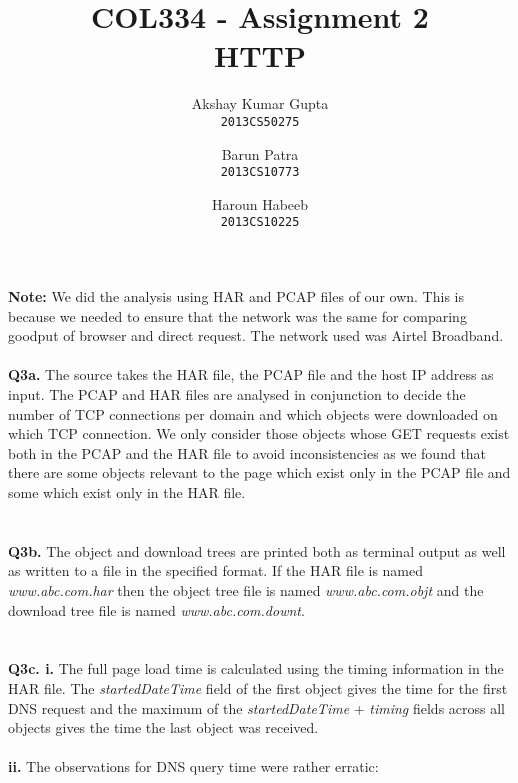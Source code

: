 \documentclass[12pt]{article}
\begin{document}
\title{COL334 - Assignment 2\\ HTTP}
\author{Akshay Kumar Gupta\\\texttt{2013CS50275} \and  Barun Patra\\\texttt{2013CS10773} \and Haroun Habeeb\\\texttt{2013CS10225}}
\date{}
\maketitle
\noindent
\textbf{Note:} We did the analysis using HAR and PCAP files of our own. This is because we needed to ensure that the network was the same for comparing goodput of browser and direct request. The network used was Airtel Broadband.\\\\
{\bfseries Q3a.} The source takes the HAR file, the PCAP file and the host IP address as input. The PCAP and HAR files are analysed in conjunction to decide the number of TCP connections per domain and which objects were downloaded on which TCP connection. We only consider those objects whose GET requests exist both in the PCAP and the HAR file to avoid inconsistencies as we found that there are some objects relevant to the page which exist only in the PCAP file and some which exist only in the HAR file.
\\\\\\
{\bfseries Q3b.} The object and download trees are printed both as terminal output as well as written to a file in the specified format. If the HAR file is named \emph{www.abc.com.har} then the object tree file is named \emph{www.abc.com.objt} and the download tree file is named \emph{www.abc.com.downt}.
\\\\\\
{\bfseries Q3c. i.} The full page load time is calculated using the timing information in the HAR file. The \emph{startedDateTime} field of the first object gives the time for the first DNS request and the maximum of the \emph{startedDateTime} + \emph{timing} fields across all objects gives the time the last object was received. \\\\
\textbf{ii.} The observations for DNS query time were rather erratic:
\end{document}
